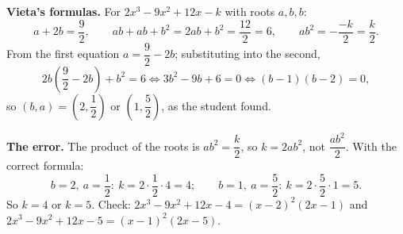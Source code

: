 \textbf{Vieta's formulas.} For $2x^3-9x^2+12x-k$ with roots $a,b,b$:
\[a+2b=\dfrac92,\qquad ab+ab+b^2=2ab+b^2=\dfrac{12}{2}=6,\qquad ab^2=-\dfrac{-k}{2}=\dfrac k2.\]
From the first equation $a=\dfrac92-2b$; substituting into the second,
\[2b\left(\dfrac92-2b\right)+b^2=6\iff3b^2-9b+6=0\iff(b-1)(b-2)=0,\]
so $(b,a)=\left(2,\dfrac12\right)$ or $\left(1,\dfrac52\right)$, as the student found.

\textbf{The error.} The product of the roots is $ab^2=\dfrac k2$, so $k=2ab^2$, not $\dfrac{ab^2}{2}$. With the correct formula:
\[b=2,\ a=\dfrac12:\ k=2\cdot\dfrac12\cdot4=4;\qquad b=1,\ a=\dfrac52:\ k=2\cdot\dfrac52\cdot1=5.\]
So $\boxed{k=4\text{ or }k=5}$. Check: $2x^3-9x^2+12x-4=(x-2)^2(2x-1)$ and $2x^3-9x^2+12x-5=(x-1)^2(2x-5)$.
